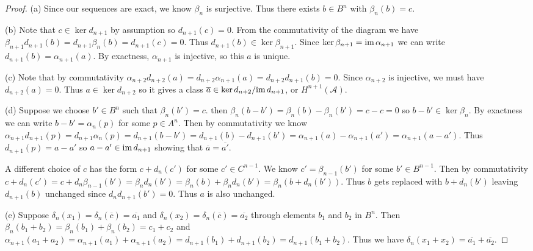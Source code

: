 \documentclass{article}
\newcommand{\im}{\textup{im}\,}
\begin{document}
\begin{proof}
(a) Since our sequences are exact, we know $\beta_n$ is surjective. Thus there exists $b \in B^n$ with $\beta_n(b) = c$.

(b) Note that $c \in \ker d_{n+1}$ by assumption so $d_{n+1}(c) = 0$. From the commutativity of the diagram we have $\beta_{n+1} d_{n+1} (b) = d_{n+1} \beta_n (b) = d_{n+1}(c) = 0$. Thus $d_{n+1}(b) \in \ker \beta_{n+1}$. Since $\ker \beta_{n+1} = \im \alpha_{n+1}$ we can write $d_{n+1}(b) = \alpha_{n+1}(a)$. By exactness, $\alpha_{n+1}$ is injective, so this $a$ is unique.

(c) Note that by commutativity $\alpha_{n+2} d_{n+2}(a) = d_{n+2} \alpha_{n+1}(a) = d_{n+2} d_{n+1}(b) = 0$. Since $\alpha_{n+2}$ is injective, we must have $d_{n+2}(a) = 0$. Thus $a \in \ker d_{n+2}$ so it gives a class $\overline{a} \in \ker d_{n+2}/\im d_{n+1}$, or $H^{n+1}(\mathcal{A})$.

(d) Suppose we choose $b' \in B^n$ such that $\beta_n(b') = c$. then $\beta_n(b-b') = \beta_n(b)-\beta_n(b') = c-c = 0$ so $b-b' \in \ker \beta_n$. By exactness we can write $b-b' = \alpha_n(p)$ for some $p \in A^n$. Then by commutativity we know $\alpha_{n+1} d_{n+1}(p) = d_{n+1} \alpha_n(p) = d_{n+1}(b-b') = d_{n+1}(b) - d_{n+1}(b') = \alpha_{n+1}(a) - \alpha_{n+1}(a') = \alpha_{n+1}(a-a')$. Thus $d_{n+1}(p) = a-a'$ so $a-a' \in \im d_{n+1}$ showing that $\overline{a} = \overline{a'}$.

A different choice of $c$ has the form $c + d_n(c')$ for some $c' \in C^{n-1}$. We know $c' = \beta_{n-1}(b')$ for some $b' \in B^{n-1}$. Then by commutativity $c + d_n(c') = c + d_n \beta_{n-1}(b') = \beta_n d_n (b')  = \beta_n(b) + \beta_n d_n(b') = \beta_n(b + d_n(b'))$. Thus $b$ gets replaced with $b + d_n(b')$ leaving $d_{n+1}(b)$ unchanged since $d_nd_{n+1}(b') = 0$. Thus $a$ is also unchanged.

(e) Suppose $\delta_n (x_1) = \delta_n(\overline{c}) = \overline{a_1}$ and $\delta_n (x_2) = \delta_n(\overline{c}) = \overline{a_2}$ through elements $b_1$ and $b_2$ in $B^n$. Then $\beta_n(b_1 + b_2) = \beta_n(b_1) + \beta_n(b_2) = c_1 + c_2$ and $\alpha_{n+1}(a_1 + a_2) = \alpha_{n+1}(a_1) + \alpha_{n+1}(a_2) = d_{n+1}(b_1) + d_{n+1}(b_2) = d_{n+1}(b_1 + b_2)$. Thus we have $\delta_n(x_1 + x_2) = \overline{a_1} + \overline{a_2}$.
\end{proof}
\end{document}
